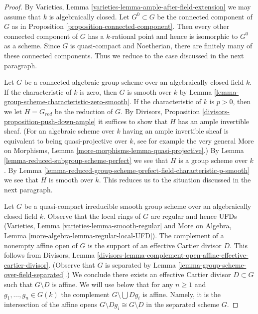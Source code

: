 \begin{proof}
By Varieties, Lemma \ref{varieties-lemma-ample-after-field-extension}
we may assume that $k$ is algebraically closed. Let $G^0 \subset G$
be the connected component of $G$ as in
Proposition \ref{proposition-connected-component}.
Then every other connected component of $G$ has a $k$-rational
point and hence is isomorphic to $G^0$ as a scheme.
Since $G$ is quasi-compact and Noetherian, there are finitely many of these
connected components. Thus we reduce to the case discussed in
the next paragraph.

\medskip\noindent
Let $G$ be a connected algebraic group scheme over an algebraically closed
field $k$. If the characteristic of $k$ is zero, then $G$ is smooth over
$k$ by Lemma \ref{lemma-group-scheme-characteristic-zero-smooth}.
If the characteristic of $k$ is $p > 0$, then we let $H = G_{red}$
be the reduction of $G$. By
Divisors, Proposition \ref{divisors-proposition-push-down-ample}
it suffices to show that $H$ has an ample invertible sheaf.
(For an algebraic scheme over $k$ having an ample invertible
sheaf is equivalent to being quasi-projective over $k$, see
for example the very general
More on Morphisms, Lemma \ref{more-morphisms-lemma-quasi-projective}.)
By Lemma \ref{lemma-reduced-subgroup-scheme-perfect}
we see that $H$ is a group scheme over $k$.
By Lemma \ref{lemma-reduced-group-scheme-prefect-field-characteristic-p-smooth}
we see that $H$ is smooth over $k$.
This reduces us to the situation discussed in the next
paragraph.

\medskip\noindent
Let $G$ be a quasi-compact irreducible smooth group scheme over an
algebraically closed field $k$. Observe that the local rings of $G$
are regular and hence UFDs
(Varieties, Lemma \ref{varieties-lemma-smooth-regular} and
More on Algebra, Lemma \ref{more-algebra-lemma-regular-local-UFD}).
The complement of a nonempty affine open of $G$
is the support of an effective Cartier divisor $D$.
This follows from Divisors, Lemma
\ref{divisors-lemma-complement-open-affine-effective-cartier-divisor}.
(Observe that $G$ is separated by
Lemma \ref{lemma-group-scheme-over-field-separated}.)
We conclude there exists an effective Cartier divisor $D \subset G$
such that $G \setminus D$ is affine. We will use below that
for any $n \geq 1$ and $g_1, \ldots, g_n \in G(k)$ the complement
$G \setminus \bigcup D g_i$ is affine. Namely, it is the intersection
of the affine opens $G \setminus Dg_i \cong G \setminus D$
in the separated scheme $G$.


\end{proof}
